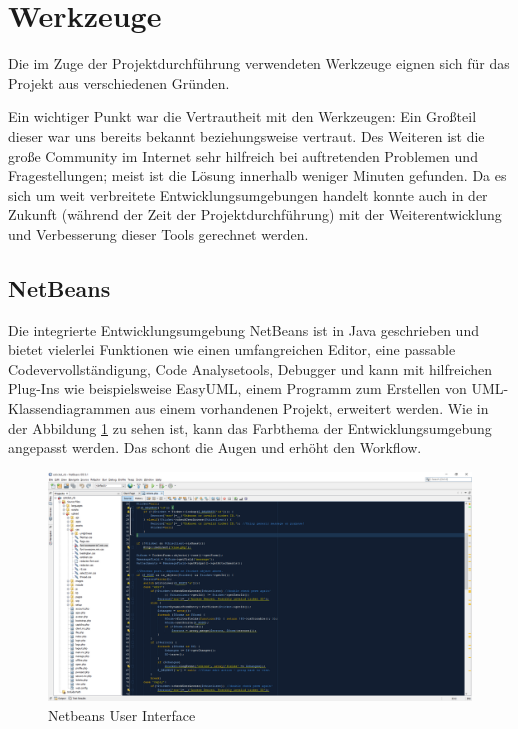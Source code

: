 	\section{Werkzeuge}
	Die im Zuge der Projektdurchführung verwendeten Werkzeuge eignen sich für das Projekt aus verschiedenen Gründen.
	
	Ein wichtiger Punkt war die Vertrautheit mit den Werkzeugen: Ein Großteil dieser war uns bereits bekannt beziehungsweise vertraut. Des Weiteren ist die große Community im Internet sehr hilfreich bei auftretenden Problemen und Fragestellungen; meist ist die Lösung innerhalb weniger Minuten gefunden. Da es sich um weit verbreitete Entwicklungsumgebungen handelt konnte auch in der Zukunft (während der Zeit der Projektdurchführung) mit der Weiterentwicklung und Verbesserung dieser Tools gerechnet werden.
	\newpage
	\subsection{NetBeans}
	Die integrierte Entwicklungsumgebung NetBeans ist in Java geschrieben und bietet vielerlei Funktionen wie einen umfangreichen Editor, eine passable Codevervollständigung, Code Analysetools, Debugger und kann mit hilfreichen Plug-Ins wie beispielsweise EasyUML, einem Programm zum Erstellen von UML-Klassendiagrammen aus einem vorhandenen Projekt, erweitert werden. Wie in der Abbildung \ref{Netbeans_GUI} zu sehen ist, kann das Farbthema der Entwicklungsumgebung angepasst werden. Das schont die Augen und erhöht den Workflow.
	
	\begin{figure}[h]
		\centering
		\includegraphics[scale=.3]{figures/netbeans_gui.png}
		\caption{Netbeans User Interface}
		\label{Netbeans_GUI}
	\end{figure}
	
